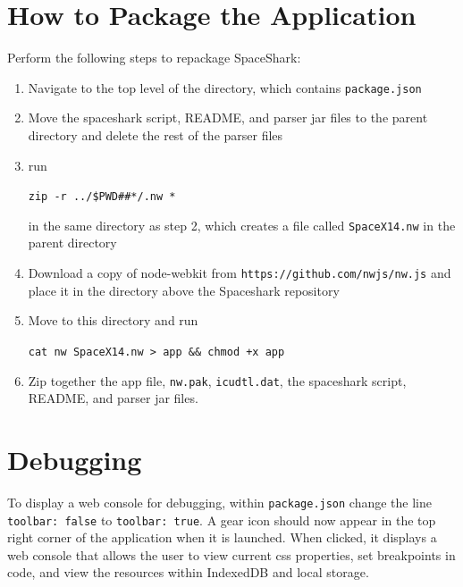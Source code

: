 \documentclass{hmcclinic}
\begin{document}
\chapter{How to Package the Application}
Perform the following steps to repackage SpaceShark:
\begin{enumerate}
  \item Navigate to the top level of the directory, which contains
    \texttt{package.json}
  \item Move the spaceshark script, README, and parser jar files to the parent directory
    and delete the rest of the parser files
  \item run
    \begin{center}\texttt{zip -r ../\${PWD\#\#*/}.nw *}\end{center} in the same
    directory as step 2, which creates a file
    called \texttt{SpaceX14.nw} in the parent directory
  \item Download a copy of node-webkit from
    \texttt{https://github.com/nwjs/nw.js} and
    place it in the directory above the Spaceshark repository
  \item Move to this directory and run 
    \begin{center}\texttt{cat nw SpaceX14.nw >
      app \&\& chmod +x app}\end{center}
  \item Zip together the app file, \texttt{nw.pak}, \texttt{icudtl.dat}, the spaceshark script,
    README, and parser jar files.
\end{enumerate}

\chapter{Debugging}
To display a web console for debugging, within \texttt{package.json} change the line
\texttt{toolbar: false} to \texttt{toolbar: true}. A gear icon should now appear in the
top right corner of the application when it is launched. When clicked, it
displays a web console that allows the user to view current css properties,
set breakpoints in code, and view the resources within IndexedDB and local
storage.
\end{document}
